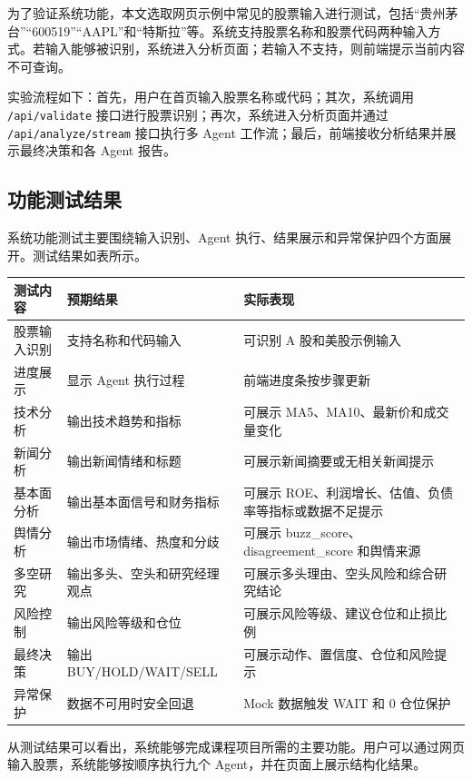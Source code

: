 \documentclass[UTF8,a4paper,12pt]{ctexart}
\begin{document}
为了验证系统功能，本文选取网页示例中常见的股票输入进行测试，包括“贵州茅台”“600519”“AAPL”和“特斯拉”等。系统支持股票名称和股票代码两种输入方式。若输入能够被识别，系统进入分析页面；若输入不支持，则前端提示当前内容不可查询。

实验流程如下：首先，用户在首页输入股票名称或代码；其次，系统调用 \texttt{/api/validate} 接口进行股票识别；再次，系统进入分析页面并通过 \texttt{/api/analyze/stream} 接口执行多 Agent 工作流；最后，前端接收分析结果并展示最终决策和各 Agent 报告。

\subsection{功能测试结果}

系统功能测试主要围绕输入识别、Agent 执行、结果展示和异常保护四个方面展开。测试结果如表所示。

\begin{center}
\begin{tabular}{lll}
\toprule
测试内容 & 预期结果 & 实际表现 \\
\midrule
股票输入识别 & 支持名称和代码输入 & 可识别 A 股和美股示例输入 \\
进度展示 & 显示 Agent 执行过程 & 前端进度条按步骤更新 \\
技术分析 & 输出技术趋势和指标 & 可展示 MA5、MA10、最新价和成交量变化 \\
新闻分析 & 输出新闻情绪和标题 & 可展示新闻摘要或无相关新闻提示 \\
基本面分析 & 输出基本面信号和财务指标 & 可展示 ROE、利润增长、估值、负债率等指标或数据不足提示 \\
舆情分析 & 输出市场情绪、热度和分歧 & 可展示 buzz\_score、disagreement\_score 和舆情来源 \\
多空研究 & 输出多头、空头和研究经理观点 & 可展示多头理由、空头风险和综合研究结论 \\
风险控制 & 输出风险等级和仓位 & 可展示风险等级、建议仓位和止损比例 \\
最终决策 & 输出 BUY/HOLD/WAIT/SELL & 可展示动作、置信度、仓位和风险提示 \\
异常保护 & 数据不可用时安全回退 & Mock 数据触发 WAIT 和 0 仓位保护 \\
\bottomrule
\end{tabular}
\end{center}

从测试结果可以看出，系统能够完成课程项目所需的主要功能。用户可以通过网页输入股票，系统能够按顺序执行九个 Agent，并在页面上展示结构化结果。
\end{document}
